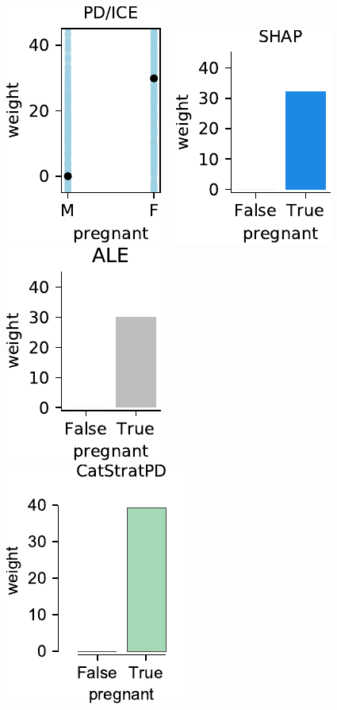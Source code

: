 \documentclass{article}
\begin{document}
\begin{figure}[htbp]
\begin{center}
\includegraphics[scale=0.45]{images/pregnant_vs_weight_pdp.pdf}~~
\includegraphics[scale=0.45]{images/pregnant_vs_weight_shap.pdf}~~
\includegraphics[scale=0.45]{images/pregnant_2_ale.pdf}~~
\includegraphics[scale=0.45]{images/pregnant_vs_weight_stratpd.pdf}~~

\end{center}
\end{figure}
\end{document}
